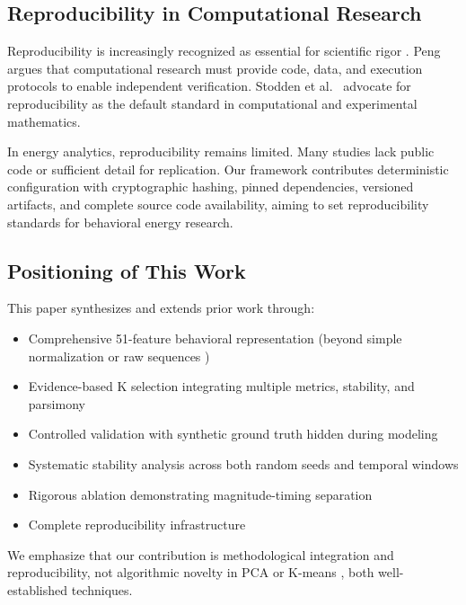 \subsection{Reproducibility in Computational Research}

Reproducibility is increasingly recognized as essential for scientific rigor \cite{peng2011reproducible,stodden2013setting}. Peng~\cite{peng2011reproducible} argues that computational research must provide code, data, and execution protocols to enable independent verification. Stodden et al.~\cite{stodden2013setting} advocate for reproducibility as the default standard in computational and experimental mathematics.

In energy analytics, reproducibility remains limited. Many studies lack public code or sufficient detail for replication. Our framework contributes deterministic configuration with cryptographic hashing, pinned dependencies, versioned artifacts, and complete source code availability, aiming to set reproducibility standards for behavioral energy research.

\subsection{Positioning of This Work}

This paper synthesizes and extends prior work through:
\begin{itemize}
    \item Comprehensive 51-feature behavioral representation (beyond simple normalization \cite{valdes2021smart} or raw sequences \cite{kwac2014household})
    \item Evidence-based K selection integrating multiple metrics, stability, and parsimony \cite{hennig2020comparing}
    \item Controlled validation with synthetic ground truth hidden during modeling \cite{meinrenken2022synthetic}
    \item Systematic stability analysis across both random seeds and temporal windows
    \item Rigorous ablation demonstrating magnitude-timing separation
    \item Complete reproducibility infrastructure \cite{peng2011reproducible}
\end{itemize}

We emphasize that our contribution is methodological integration and reproducibility, not algorithmic novelty in PCA \cite{jolliffe2002pca} or K-means \cite{lloyd1982least,arthur2007kmeans}, both well-established techniques.
